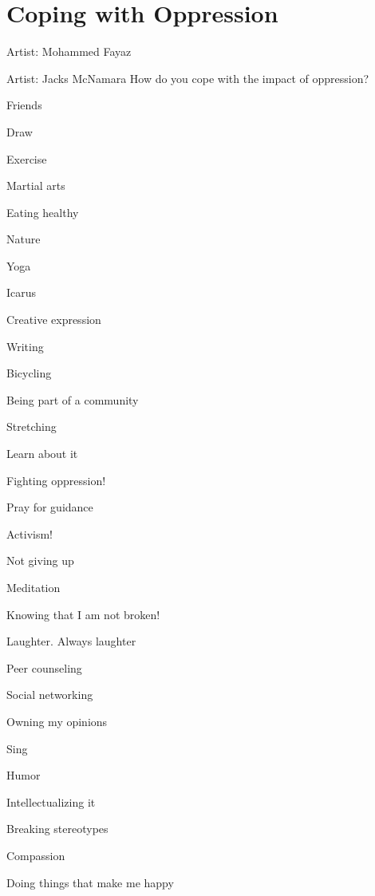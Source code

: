 

\chapter{Coping with Oppression}
Artist: Mohammed Fayaz

\newpage

Artist: Jacks McNamara
How do you cope with the impact of oppression?

\begin{multicols}{2}
\begin{checkboxlist}
Friends
\item Draw
\item Exercise
\item Martial arts
\item Eating healthy
\item Nature
\item Yoga
\item Icarus
\item Creative expression
\item Writing
\item Bicycling
\item Being part of a community
\item Stretching
\item Learn about it
\item Fighting oppression!
\item Pray for guidance
\item Activism!
\item Not giving up
\item Meditation
\item Knowing that I am not broken!
\item Laughter. Always laughter
\item Peer counseling
\item Social networking
\item Owning my opinions
\item Sing
\item Humor
\item Intellectualizing it
\item Breaking stereotypes
\item Compassion
\item Doing things that make me happy

\end{checkboxlist}
\end{multicols}
